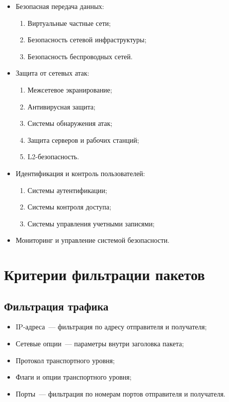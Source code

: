 	\begin{itemize}
		\item Безопасная передача данных:
		
		\begin{enumerate}
			\item Виртуальные частные сети;
			\item Безопасность сетевой инфраструктуры;
			\item Безопасность беспроводных сетей.
		\end{enumerate}
		
		\item Защита от сетевых атак:
		
		\begin{enumerate}
			\item Межсетевое экранирование;
			\item Антивирусная защита;
			\item Системы обнаружения атак;
			\item Защита серверов и рабочих станций;
			\item L2-безопасность.
		\end{enumerate}
		
		\item Идентификация и контроль пользователей:
		
		\begin{enumerate}
			\item Системы аутентификации;
			\item Системы контроля доступа;
			\item Системы управления учетными записями;
		\end{enumerate}
		
		\item Мониторинг и управление системой безопасности.
	\end{itemize}
	
	\newpage
	
	\section{Критерии фильтрации пакетов}
	
	\subsection*{Фильтрация трафика}
	
	\begin{itemize}
		\item IP-адреса~--- фильтрация по адресу отправителя и получателя;
		\item Сетевые опции~--- параметры внутри заголовка пакета;
		\item Протокол транспортного уровня;
		\item Флаги и опции транспортного уровня;
		\item Порты~--- фильтрация по номерам портов отправителя и получателя.
	\end{itemize}
	
